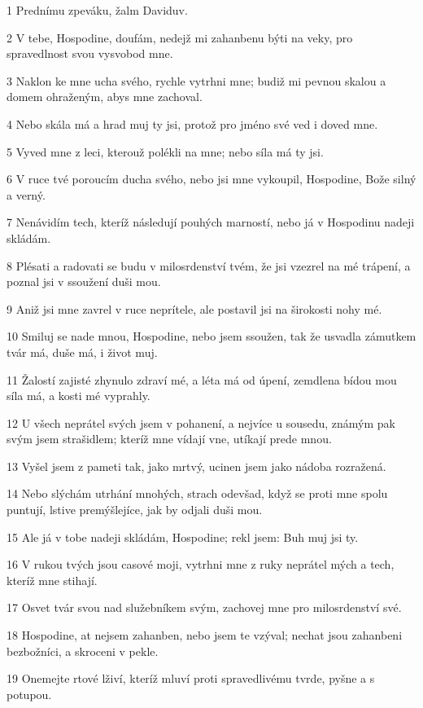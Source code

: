 \par 1 Prednímu zpeváku, žalm Daviduv.
\par 2 V tebe, Hospodine, doufám, nedejž mi zahanbenu býti na veky, pro spravedlnost svou vysvobod mne.
\par 3 Naklon ke mne ucha svého, rychle vytrhni mne; budiž mi pevnou skalou a domem ohraženým, abys mne zachoval.
\par 4 Nebo skála má a hrad muj ty jsi, protož pro jméno své ved i doved mne.
\par 5 Vyved mne z leci, kterouž polékli na mne; nebo síla má ty jsi.
\par 6 V ruce tvé poroucím ducha svého, nebo jsi mne vykoupil, Hospodine, Bože silný a verný.
\par 7 Nenávidím tech, kteríž následují pouhých marností, nebo já v Hospodinu nadeji skládám.
\par 8 Plésati a radovati se budu v milosrdenství tvém, že jsi vzezrel na mé trápení, a poznal jsi v ssoužení duši mou.
\par 9 Aniž jsi mne zavrel v ruce neprítele, ale postavil jsi na širokosti nohy mé.
\par 10 Smiluj se nade mnou, Hospodine, nebo jsem ssoužen, tak že usvadla zámutkem tvár má, duše má, i život muj.
\par 11 Žalostí zajisté zhynulo zdraví mé, a léta má od úpení, zemdlena bídou mou síla má, a kosti mé vyprahly.
\par 12 U všech neprátel svých jsem v pohanení, a nejvíce u sousedu, známým pak svým jsem strašidlem; kteríž mne vídají vne, utíkají prede mnou.
\par 13 Vyšel jsem z pameti tak, jako mrtvý, ucinen jsem jako nádoba rozražená.
\par 14 Nebo slýchám utrhání mnohých, strach odevšad, když se proti mne spolu puntují, lstive premýšlejíce, jak by odjali duši mou.
\par 15 Ale já v tobe nadeji skládám, Hospodine; rekl jsem: Buh muj jsi ty.
\par 16 V rukou tvých jsou casové moji, vytrhni mne z ruky neprátel mých a tech, kteríž mne stihají.
\par 17 Osvet tvár svou nad služebníkem svým, zachovej mne pro milosrdenství své.
\par 18 Hospodine, at nejsem zahanben, nebo jsem te vzýval; nechat jsou zahanbeni bezbožníci, a skroceni v pekle.
\par 19 Onemejte rtové lživí, kteríž mluví proti spravedlivému tvrde, pyšne a s potupou.
